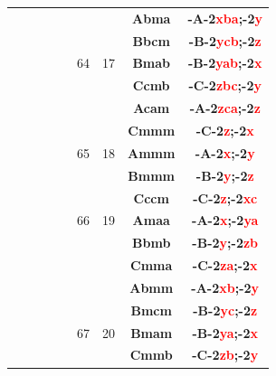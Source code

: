 \documentclass{article}      %
\begin{document}
\begin{small}
\begin{longtable}[c]{|c|c|c|c|c|c|c|c|c|}
          &  & & & &  & &\textbf{Abma}         &\textbf{-A-2\textcolor{red}{xba};-2\textcolor{red}{y}}\\\cline{8-9}       
          &  & & & &  & &\textbf{Bbcm}         &\textbf{-B-2\textcolor{red}{ycb};-2\textcolor{red}{z}}\\\cline{8-9}       
	  &  & & & &\textrm{64}  &\textrm{17} &\textbf{Bmab}         &\textbf{-B-2\textcolor{red}{yab};-2\textcolor{red}{x}}\\\cline{8-9}       
          &  & & & &  & &\textbf{Ccmb}         &\textbf{-C-2\textcolor{red}{zbc};-2\textcolor{red}{y}}\\\cline{8-9}       
          &  & & & &  & &\textbf{Acam}         &\textbf{-A-2\textcolor{red}{zca};-2\textcolor{red}{z}}\\\cline{6-9}       
          &  & & & &  & &\textbf{Cmmm}         &\textbf{-C-2\textcolor{red}{z};-2\textcolor{red}{x}}\\\cline{8-9}         
	  &  & & & &\textrm{65}  &\textrm{18} &\textbf{Ammm}         &\textbf{-A-2\textcolor{red}{x};-2\textcolor{red}{y}}\\\cline{8-9}         
          &  & & & &  & &\textbf{Bmmm}         &\textbf{-B-2\textcolor{red}{y};-2\textcolor{red}{z}}\\\cline{6-9}         
          &  & & & &  & &\textbf{Cccm}         &\textbf{-C-2\textcolor{red}{z};-2\textcolor{red}{xc}}\\\cline{8-9}        
	  &  & & & &\textrm{66}  &\textrm{19} &\textbf{Amaa}         &\textbf{-A-2\textcolor{red}{x};-2\textcolor{red}{ya}}\\\cline{8-9}        
          &  & & & &  & &\textbf{Bbmb}         &\textbf{-B-2\textcolor{red}{y};-2\textcolor{red}{zb}}\\\cline{6-9}        
          &  & & & &  & &\textbf{Cmma}         &\textbf{-C-2\textcolor{red}{za};-2\textcolor{red}{x}}\\\cline{8-9}        
          &  & & & &  & &\textbf{Abmm}         &\textbf{-A-2\textcolor{red}{xb};-2\textcolor{red}{y}}\\\cline{8-9}        
          &  & & & &  & &\textbf{Bmcm}         &\textbf{-B-2\textcolor{red}{yc};-2\textcolor{red}{z}}\\\cline{8-9}        
	  &  & & & &\textrm{67}  &\textrm{20} &\textbf{Bmam}         &\textbf{-B-2\textcolor{red}{ya};-2\textcolor{red}{x}}\\\cline{8-9}        
          &  & & & &  & &\textbf{Cmmb}         &\textbf{-C-2\textcolor{red}{zb};-2\textcolor{red}{y}}\\\cline{8-9}        

\end{longtable}
\end{small}
\end{document}

